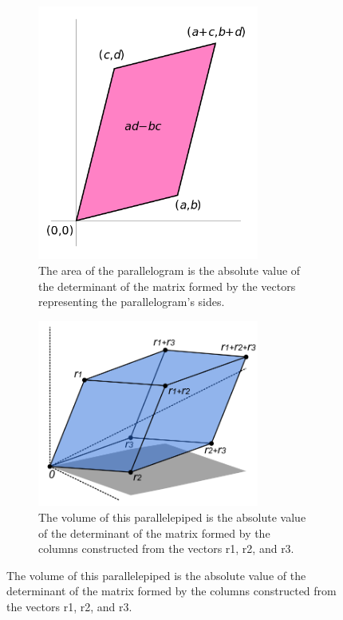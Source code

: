 \documentclass[11pt]{book} %
\begin{document}
\begin{figure}[H]
    \begin{subfigure}{0.4\textwidth}
        \centering
        \includegraphics[width=0.8\textwidth]{Figs/area_parallellogram_as_determinant.png}
        \caption{The area of the parallelogram is the absolute value of the determinant of the matrix formed by the vectors representing the parallelogram's sides.}
    \end{subfigure}
    \hfill
    \begin{subfigure}{0.4\textwidth}
        \centering
        \includegraphics[width=0.8\textwidth]{Figs/determinant_parallelepiped.png}
        \caption{The volume of this parallelepiped is the absolute value of the determinant of the matrix formed by the columns constructed from the vectors r1, r2, and r3.}
    \end{subfigure}
\end{figure}
\end{document}
